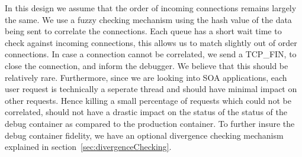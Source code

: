In this design we assume that the order of incoming connections remains largely the same.
We use a fuzzy checking mechanism using the hash value of the data being sent to correlate the connections. 
Each queue has a short wait time to check against incoming connections, this allows us to match slightly out of order connections.
In case a connection cannot be correlated, we send a TCP\_FIN, to close the connection, and inform the debugger.
We believe that this should be relatively rare.
Furthermore, since we are looking into SOA applications, each user request is technically a seperate thread and should have minimal impact on other requests. 
Hence killing a small percentage of requests which could not be correlated, should not have a drastic impact on the status of the status of the debug container as compared to the production container. 
To further insure the debug container fidelity, we have an optional divergence checking mechanism explained in section~\ref{sec:divergenceChecking}.
